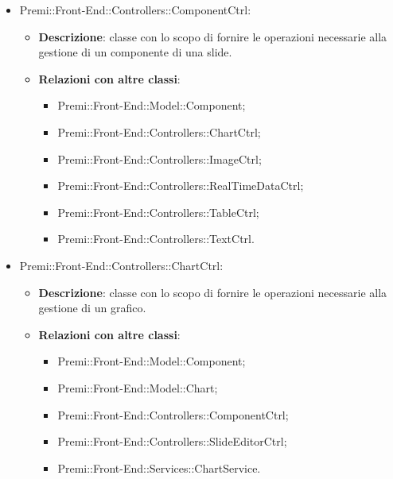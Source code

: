 \begin{itemize}
	\item  Premi::Front-End::Controllers::ComponentCtrl:
	\begin{itemize}
		\item \textbf{Descrizione}: classe con lo scopo di fornire le operazioni necessarie alla gestione di un componente di una \gls{slide}.
		\item \textbf{Relazioni con altre classi}:
			\begin{itemize}
				\item Premi::Front-End::Model::Component;
				\item Premi::Front-End::Controllers::ChartCtrl;
				\item Premi::Front-End::Controllers::ImageCtrl;
				\item Premi::Front-End::Controllers::RealTimeDataCtrl;
				\item Premi::Front-End::Controllers::TableCtrl;
				\item Premi::Front-End::Controllers::TextCtrl.
			\end{itemize}
	\end{itemize}
	
	
	
	
	
	
	
	
	
	
	
	
	
	
	\item  Premi::Front-End::Controllers::ChartCtrl:
		\begin{itemize}
			\item \textbf{Descrizione}: classe con lo scopo di fornire le operazioni necessarie alla gestione di un grafico.
			\item \textbf{Relazioni con altre classi}:
				\begin{itemize}
					\item Premi::Front-End::Model::Component;
					\item Premi::Front-End::Model::Chart;
					\item Premi::Front-End::Controllers::ComponentCtrl;
					\item Premi::Front-End::Controllers::SlideEditorCtrl;
					\item Premi::Front-End::Services::ChartService.
				\end{itemize}
		\end{itemize}
		

\end{itemize}
